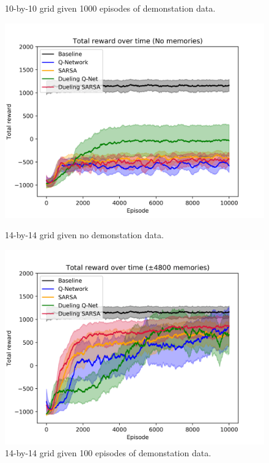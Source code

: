 \begin{figure}[h]
    \caption{10-by-10 grid given 1000 episodes of demonstation data.}
    \label{fig:10sized-1000mem}
\end{figure}
\begin{figure}[h]
    \centering
    \includegraphics[width=\linewidth]{img/results/14-sized/total_rewards_0m-min.png}
    \caption{14-by-14 grid given no demonstation data.}
    \label{fig:14sized-nomem}
    \includegraphics[width=\linewidth]{img/results/14-sized/total_rewards_100m-min.png}
    \caption{14-by-14 grid given 100 episodes of demonstation data.}
    \label{fig:14sized-100mem}

\end{figure}
